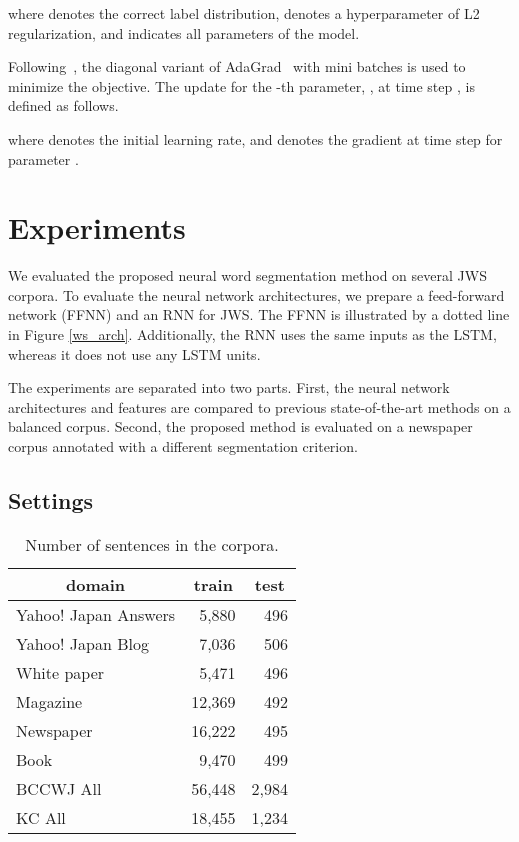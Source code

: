 \documentclass[11pt]{article}
\begin{document}
where  denotes the correct label distribution,  denotes a
hyperparameter of L2 regularization, and  indicates all parameters of
the model.
 
Following~\cite{socher2013parsing}, the diagonal variant of
AdaGrad~\cite{duchi2011adaptive} with mini batches is used to minimize the
objective. The update for the -th parameter, , at time step
, is defined as follows.

where  denotes the initial learning rate, and  denotes the gradient at time step  for parameter . 

\section{Experiments}


We evaluated the proposed neural word segmentation method on several JWS corpora.
To evaluate the neural network architectures, we prepare a feed-forward
network (FFNN) and an RNN for JWS. The FFNN is
illustrated by a dotted line in Figure \ref{ws_arch}. Additionally, the RNN
uses the same inputs as the LSTM, whereas it does not use any LSTM units.

The experiments are separated into two parts. First, the neural network
architectures and features are compared to previous state-of-the-art methods
on a balanced corpus. 
Second, the proposed method is evaluated on a newspaper corpus annotated with
a different segmentation criterion.

\subsection{Settings}
\begin{table}[t]
\caption{Number of sentences in the corpora.}
\label{bccwj}
\centering
\begin{tabular}{p{45mm}rr}
  \toprule
  \multicolumn{1}{c}{domain} & \multicolumn{1}{c}{train} &\multicolumn{1}{c}{test} \\
  \midrule
  Yahoo! Japan Answers  & 5,880 & 496 \\    
  Yahoo! Japan Blog     & 7,036 & 506 \\
  White paper           & 5,471 & 496 \\
  Magazine              &12,369 & 492 \\   
  Newspaper             &16,222 & 495 \\
  Book                  & 9,470 & 499 \\
  BCCWJ All             &56,448 &2,984\\
  \midrule
  KC All                &18,455 &1,234\\
  \bottomrule
\end{tabular}
\end{table}  
\end{document}
